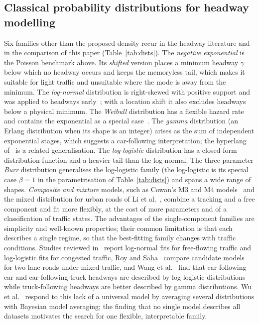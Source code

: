 \documentclass[11pt,a4paper]{article}
\numberwithin{equation}{section}
\begin{document}
\subsection{Classical probability distributions for headway modelling}
Six families other than the proposed density recur in the headway literature and in the comparison of this paper (Table~\ref{tab:dists}).
The \emph{negative exponential} is the Poisson benchmark above. Its \emph{shifted} version places a minimum headway $\gamma$ below which no headway occurs and keeps the
memoryless tail, which makes it suitable for light traffic and unsuitable where the mode is away from the minimum. The \emph{log-normal} distribution is right-skewed with positive support and was applied to headways
early~\cite{greenberg1966}; with a location shift it also excludes headways below a physical minimum. The \emph{Weibull} distribution has a flexible hazard rate and contains the exponential as a special case~\cite{johnson1995}.
The \emph{gamma} distribution (an Erlang distribution when its shape is an integer) arises as the sum of independent exponential stages, which suggests a car-following interpretation; the hyperlang of~\cite{dawson1968} is a related generalisation.
The \emph{log-logistic} distribution has a closed-form distribution function and a heavier tail than the log-normal. The three-parameter \emph{Burr} distribution
generalises the log-logistic family (the log-logistic is its special case $\beta=1$ in the parametrisation of Table~\ref{tab:dists}) and spans a wide range of shapes. \emph{Composite and mixture} models,
such as Cowan's M3 and M4 models~\cite{cowan1975} and the mixed distribution for urban roads of Li et al.~\cite{li2021access}, combine a tracking and a free component and fit more flexibly, at the cost of more parameters and of
a classification of traffic states.
The advantages of the single-component families are simplicity and well-known properties; their common limitation is that each describes a single regime, so that the best-fitting family changes with traffic conditions.
Studies reviewed in~\cite{leungbootnak} report log-normal fits for free-flowing traffic and log-logistic fits for congested traffic, Roy and Saha~\cite{roysaha2017} compare candidate models for two-lane roads
under mixed traffic, and Wang et al.~\cite{wang2022} find that car-following-car and car-following-truck headways are described by log-logistic distributions while truck-following headways are better described by gamma distributions.
Wu et al.~\cite{wu2023} respond to this lack of a universal model by averaging several distributions with Bayesian model averaging; the finding that no single model describes all datasets motivates the search for one flexible, interpretable family.
\end{document}
